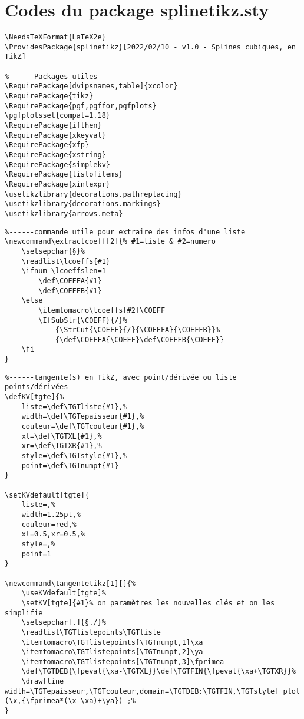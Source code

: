 \documentclass{article}
\begin{document}
\newpage

\section{Codes du package splinetikz.sty}

\begin{verbatim}
\NeedsTeXFormat{LaTeX2e}
\ProvidesPackage{splinetikz}[2022/02/10 - v1.0 - Splines cubiques, en TikZ]

%------Packages utiles
\RequirePackage[dvipsnames,table]{xcolor}
\RequirePackage{tikz}
\RequirePackage{pgf,pgffor,pgfplots}
\pgfplotsset{compat=1.18}
\RequirePackage{ifthen}
\RequirePackage{xkeyval}
\RequirePackage{xfp}
\RequirePackage{xstring}
\RequirePackage{simplekv}
\RequirePackage{listofitems}
\RequirePackage{xintexpr}
\usetikzlibrary{decorations.pathreplacing}
\usetikzlibrary{decorations.markings}
\usetikzlibrary{arrows.meta}
\end{verbatim}

\begin{verbatim}
%------commande utile pour extraire des infos d'une liste
\newcommand\extractcoeff[2]{% #1=liste & #2=numero
	\setsepchar{§}%
	\readlist\lcoeffs{#1}
	\ifnum \lcoeffslen=1
		\def\COEFFA{#1}
		\def\COEFFB{#1}
	\else
		\itemtomacro\lcoeffs[#2]\COEFF
		\IfSubStr{\COEFF}{/}%
			{\StrCut{\COEFF}{/}{\COEFFA}{\COEFFB}}%
			{\def\COEFFA{\COEFF}\def\COEFFB{\COEFF}}
	\fi
}
\end{verbatim}

\begin{verbatim}
%------tangente(s) en TikZ, avec point/dérivée ou liste points/dérivées
\defKV[tgte]{%
	liste=\def\TGTliste{#1},%
	width=\def\TGTepaisseur{#1},%
	couleur=\def\TGTcouleur{#1},%
	xl=\def\TGTXL{#1},%
	xr=\def\TGTXR{#1},%
	style=\def\TGTstyle{#1},%
	point=\def\TGTnumpt{#1}
}

\setKVdefault[tgte]{
	liste=,%
	width=1.25pt,%
	couleur=red,%
	xl=0.5,xr=0.5,%
	style=,%
	point=1
}

\newcommand\tangentetikz[1][]{%
	\useKVdefault[tgte]%
	\setKV[tgte]{#1}% on paramètres les nouvelles clés et on les simplifie
	\setsepchar[.]{§./}%
	\readlist\TGTlistepoints\TGTliste
	\itemtomacro\TGTlistepoints[\TGTnumpt,1]\xa
	\itemtomacro\TGTlistepoints[\TGTnumpt,2]\ya
	\itemtomacro\TGTlistepoints[\TGTnumpt,3]\fprimea
	\def\TGTDEB{\fpeval{\xa-\TGTXL}}\def\TGTFIN{\fpeval{\xa+\TGTXR}}%
	\draw[line width=\TGTepaisseur,\TGTcouleur,domain=\TGTDEB:\TGTFIN,\TGTstyle] plot (\x,{\fprimea*(\x-\xa)+\ya}) ;%
}
\end{verbatim}
\end{document}
